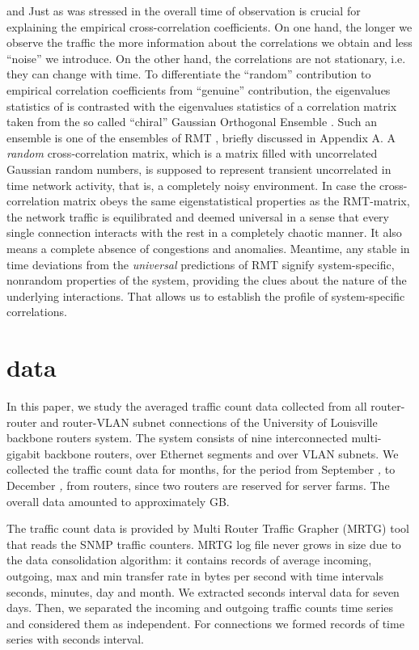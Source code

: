 \documentclass{IEEEtran}
\begin{document}
and 
Just as was stressed in \cite{Guhr1,Sharifi,Stockman} the overall
time of observation is crucial for explaining the empirical cross-correlation
coefficients. On one hand, the longer we observe the traffic the more
information about the correlations we obtain and less {}``noise''
we introduce. On the other hand, the correlations are not stationary,
i.e. they can change with time. To differentiate the {}``random''
contribution to empirical correlation coefficients from {}``genuine''
contribution, the eigenvalues statistics of  is contrasted with
the eigenvalues statistics of a correlation matrix taken from the
so called {}``chiral'' Gaussian Orthogonal Ensemble \cite{Guhr1}.
Such an ensemble is one of the ensembles of RMT \cite{Stockman,Bouchaud},
briefly discussed in Appendix A. A \emph{random} cross-correlation
matrix, which is a matrix filled with uncorrelated Gaussian random
numbers, is supposed to represent transient uncorrelated in time network
activity, that is, a completely noisy environment. In case the cross-correlation
matrix  obeys the same eigenstatistical properties as the RMT-matrix,
the network traffic is equilibrated and deemed universal in a sense
that every single connection interacts with the rest in a completely
chaotic manner. It also means a complete absence of congestions and
anomalies. Meantime, any stable in time deviations from the \emph{universal}
predictions of RMT signify system-specific, nonrandom properties of
the system, providing the clues about the nature of the underlying
interactions. That allows us to establish the profile of system-specific
correlations. 


\section{data}

In this paper, we study the averaged traffic count data collected
from all router-router and router-VLAN subnet connections of the University
of Louisville backbone routers system. The system consists of nine
interconnected multi-gigabit backbone routers, over  Ethernet
segments and over  VLAN subnets. We collected the traffic count
data for  months, for the period from September \emph{, }
to December \emph{, } from  routers, since two routers
are reserved for server farms. The overall data amounted to approximately
 GB.

The traffic count data is provided by Multi Router Traffic Grapher
(MRTG) tool that reads the SNMP traffic counters. MRTG log file never
grows in size due to the data consolidation algorithm: it contains
records of average incoming, outgoing, max and min transfer rate in
bytes per second with time intervals  seconds, \emph{}
minutes,  day and  month. We extracted  seconds interval
data for seven days. Then, we separated the incoming and outgoing
traffic counts time series and considered them as independent. For
 connections we formed  records of  time series
with  seconds interval. 
\end{document}
